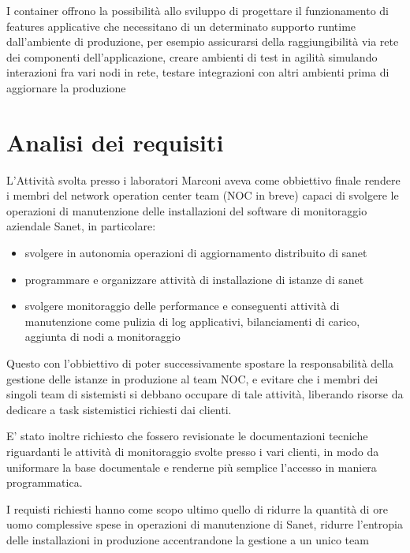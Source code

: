 \documentclass[12pt,a4paper,twoside,openright]{book}
\begin{document}
I container offrono la possibilità allo sviluppo di progettare il funzionamento di features applicative che necessitano di un determinato supporto runtime dall'ambiente di produzione, per esempio assicurarsi della raggiungibilità via rete dei componenti dell'applicazione, creare ambienti di test in agilità simulando interazioni fra vari nodi in rete, testare integrazioni con altri ambienti prima di aggiornare la produzione

\chapter{Analisi dei requisiti}

L'Attività svolta presso i laboratori Marconi aveva come obbiettivo finale rendere i membri del network operation center team (NOC in breve) capaci di svolgere le operazioni di manutenzione delle installazioni del software di monitoraggio aziendale Sanet, in particolare:

\begin{itemize}
\item svolgere in autonomia operazioni di aggiornamento distribuito di sanet
\item programmare e organizzare attività di installazione di istanze di sanet
\item svolgere monitoraggio delle performance e conseguenti attività di manutenzione come pulizia di log applicativi, bilanciamenti di carico, aggiunta di nodi a monitoraggio
\end{itemize}

Questo con l'obbiettivo di poter successivamente spostare la responsabilità della gestione delle istanze in produzione al team NOC, e evitare che i membri dei singoli team di sistemisti si debbano occupare di tale attività, liberando risorse da dedicare a task sistemistici richiesti dai clienti.

E' stato inoltre richiesto che fossero revisionate le documentazioni tecniche riguardanti le attività di monitoraggio svolte presso i vari clienti, in modo da uniformare la base documentale e renderne più semplice l'accesso in maniera programmatica.

I requisti richiesti hanno come scopo ultimo quello di ridurre la quantità di ore uomo complessive spese in operazioni di manutenzione di Sanet, ridurre l'entropia delle installazioni in produzione accentrandone la gestione a un unico team
\end{document}
